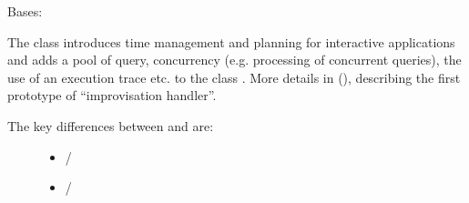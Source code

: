 \documentclass[letterpaper,10pt,english]{sphinxmanual}
\begin{document}
\begin{fulllineitems}
\label{\detokenize{index:Generator.GenerationHandler}}
Bases: {\hyperref[\detokenize{index:Generator.Generator}]{}}

The class  introduces time management and planning for interactive applications and adds a pool of query, concurrency (e.g. processing of concurrent queries), the use of an execution trace etc. to the class {\hyperref[\detokenize{index:Generator.Generator}]{}}.
More details in  (), describing the first prototype of “improvisation handler”.
\begin{description}
\item[{The key differences between {\hyperref[\detokenize{index:Generator.Generator}]{}} and {\hyperref[\detokenize{index:Generator.GenerationHandler}]{}} are:}] \leavevmode\begin{itemize}
\item {} 
{\hyperref[\detokenize{index:Generator.Generator.receive_query}]{}} / {\hyperref[\detokenize{index:Generator.GenerationHandler.receive_query}]{}}

\item {} 
{\hyperref[\detokenize{index:Generator.Generator.process_query}]{}} / {\hyperref[\detokenize{index:Generator.GenerationHandler.process_query}]{}}


\end{itemize}
\end{description}
\end{fulllineitems}
\end{document}
